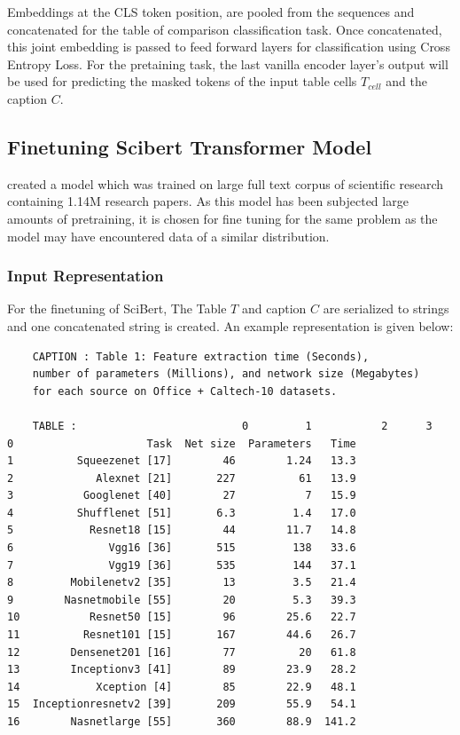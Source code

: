 Embeddings at the CLS token position, are pooled from the sequences and concatenated for the table of comparison classification task. Once concatenated, this joint embedding is passed to feed forward layers for classification using Cross Entropy Loss. For the pretaining task, the last vanilla encoder layer’s output will be used for predicting the masked tokens of the input table cells $T_{cell}$ and the caption $C$.

\subsection{Finetuning Scibert Transformer Model}
\cite{beltagy2019scibert} created a model which was trained on large full text corpus of scientific research containing 1.14M research papers. As this model has been subjected large amounts of pretraining, it is chosen for fine tuning for the same problem as the model may have encountered data of a similar distribution. 
\subsubsection{Input Representation}
\label{table_classification:models:sb:input_rep}
For the finetuning of SciBert, The Table $T$ and caption $C$ are serialized to strings and one concatenated string is created. An example representation is given below: 
\begin{verbatim}
    CAPTION : Table 1: Feature extraction time (Seconds), 
    number of parameters (Millions), and network size (Megabytes) 
    for each source on Office + Caltech-10 datasets.

    TABLE :                          0         1           2      3
0                     Task  Net size  Parameters   Time
1          Squeezenet [17]        46        1.24   13.3
2             Alexnet [21]       227          61   13.9
3           Googlenet [40]        27           7   15.9
4          Shufflenet [51]       6.3         1.4   17.0
5            Resnet18 [15]        44        11.7   14.8
6               Vgg16 [36]       515         138   33.6
7               Vgg19 [36]       535         144   37.1
8         Mobilenetv2 [35]        13         3.5   21.4
9        Nasnetmobile [55]        20         5.3   39.3
10           Resnet50 [15]        96        25.6   22.7
11          Resnet101 [15]       167        44.6   26.7
12        Densenet201 [16]        77          20   61.8
13        Inceptionv3 [41]        89        23.9   28.2
14            Xception [4]        85        22.9   48.1
15  Inceptionresnetv2 [39]       209        55.9   54.1
16        Nasnetlarge [55]       360        88.9  141.2
\end{verbatim}

